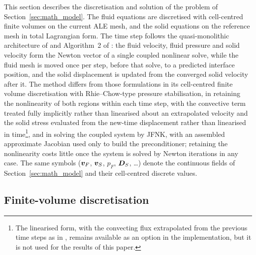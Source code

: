 This section describes the discretisation and solution of the problem of Section~\ref{sec:math_model}.
The fluid equations are discretised with cell-centred finite volumes on the current ALE mesh, and the solid equations on the reference mesh in total Lagrangian form.
The time step follows the quasi-monolithic architecture of \citet{Liu2014} and Algorithm~2 of \citet[Chapter~6]{JaimanJoshi2022}: the fluid velocity, fluid pressure and solid velocity form the Newton vector of a single coupled nonlinear solve, while the fluid mesh is moved once per step, before that solve, to a predicted interface position, and the solid displacement is updated from the converged solid velocity after it.
The method differs from those formulations in its cell-centred finite volume discretisation with Rhie--Chow-type pressure stabilisation, in retaining the nonlinearity of both regions within each time step, with the convective term treated fully implicitly rather than linearised about an extrapolated velocity and the solid stress evaluated from the new-time displacement rather than linearised in time\footnote{The linearised form, with the convecting flux extrapolated from the previous time steps as in \citet[Chapter~6]{JaimanJoshi2022}, remains available as an option in the implementation, but it is not used for the results of this paper.}, and in solving the coupled system by JFNK, with an assembled approximate Jacobian used only to build the preconditioner; retaining the nonlinearity costs little once the system is solved by Newton iterations in any case.
The same symbols ($\boldsymbol{v}_F$, $\boldsymbol{v}_S$, $p_F$, $\boldsymbol{D}_S$, \ldots) denote the continuous fields of Section~\ref{sec:math_model} and their cell-centred discrete values.

\subsection{Finite-volume discretisation}
\label{sec:fv_discretisation}

